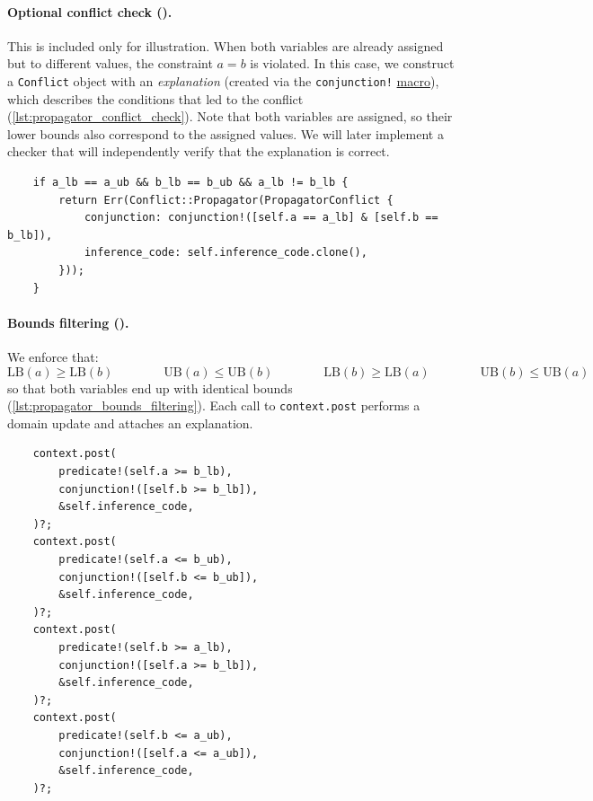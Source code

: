 \documentclass{article}
\begin{document}
\paragraph{Optional conflict check ().}  
    This is included only for illustration.  
    When both variables are already assigned but to different values, the constraint $a = b$ is violated.  
    In this case, we construct a \texttt{Conflict} object with an \emph{explanation} (created via the \texttt{conjunction!} \href{https://doc.rust-lang.org/book/ch20-05-macros.html#macros}{macro}), which describes the conditions that led to the conflict (\autoref{lst:propagator_conflict_check}).
    Note that both variables are assigned, so their lower bounds also correspond to the assigned values.
    We will later implement a checker that will independently verify that the explanation is correct.
    \begin{listing}[H]
        \begin{verbatim}
    if a_lb == a_ub && b_lb == b_ub && a_lb != b_lb {
        return Err(Conflict::Propagator(PropagatorConflict {
            conjunction: conjunction!([self.a == a_lb] & [self.b == b_lb]),
            inference_code: self.inference_code.clone(),
        }));
    }
            \end{verbatim}
        \caption{Optional Conflict Check}
        \label{lst:propagator_conflict_check}
    \end{listing}

\paragraph{Bounds filtering ().}  
    We enforce that:
    \[
    \mathrm{LB}(a) \ge \mathrm{LB}(b)\qquad\qquad
    \mathrm{UB}(a) \le \mathrm{UB}(b)\qquad\qquad
    \mathrm{LB}(b) \ge \mathrm{LB}(a)\qquad\qquad
    \mathrm{UB}(b) \le \mathrm{UB}(a)
    \]
    so that both variables end up with identical bounds (\autoref{lst:propagator_bounds_filtering}).  
    Each call to \texttt{context.post} performs a domain update and attaches an explanation.

    \begin{listing}[H]
        \begin{verbatim}
    context.post(
        predicate!(self.a >= b_lb),
        conjunction!([self.b >= b_lb]),
        &self.inference_code,
    )?;
    context.post(
        predicate!(self.a <= b_ub),
        conjunction!([self.b <= b_ub]),
        &self.inference_code,
    )?;
    context.post(
        predicate!(self.b >= a_lb),
        conjunction!([self.a >= b_lb]),
        &self.inference_code,
    )?;
    context.post(
        predicate!(self.b <= a_ub),
        conjunction!([self.a <= a_ub]),
        &self.inference_code,
    )?;
        \end{verbatim}
        \caption{Bounds Filtering}
        \label{lst:propagator_bounds_filtering}
    \end{listing}
\end{document}
